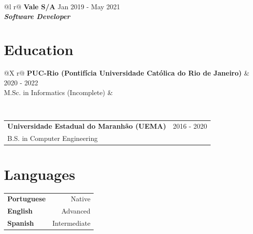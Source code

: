 \documentclass[a4paper,8pt]{article}
\begin{document}
\begin{tabularx}{\linewidth}{ @{}l r@{} }
\textbf{Vale S/A} \hfill \color[HTML]{371e77} Jan 2019 - May 2021 \\[4pt]
\color[HTML]{371e77}\textbf{\textit{Software Developer}}\ \hfill \color[HTML]{4B28A4} \\[5pt]
\end{tabularx}

\section{Education}
\begin{tabularx}{\linewidth}{ @{}X r@{} }
\color[HTML]{1C033C} \textbf{PUC-Rio (Pontifícia Universidade Católica do Rio de Janeiro)} & \hfill \color[HTML]{371e77} 2020 - 2022 \\
\color[HTML]{371e77} M.Sc. in Informatics (Incomplete) & \hfill \color[HTML]{4B28A4} \\
\end{tabularx}\\[3pt]

\begin{tabularx}{\linewidth}{ @{}X r@{} }
\color[HTML]{1C033C} \textbf{Universidade Estadual do Maranhão (UEMA)} & \hfill \color[HTML]{371e77} 2016 - 2020 \\
\color[HTML]{1C033C} B.S. in Computer Engineering & \hfill \color[HTML]{4B28A4} \\
\end{tabularx}

\section{Languages}
\begin{tabularx}{\linewidth}{ @{}X r@{} }
\color[HTML]{1C033C} \textbf{Portuguese} & \hfill \color[HTML]{371e77} Native \\
\color[HTML]{1C033C} \textbf{English} & \hfill \color[HTML]{371e77} Advanced \\
\color[HTML]{1C033C} \textbf{Spanish} & \hfill \color[HTML]{371e77} Intermediate \\
\end{tabularx}
\end{document}
